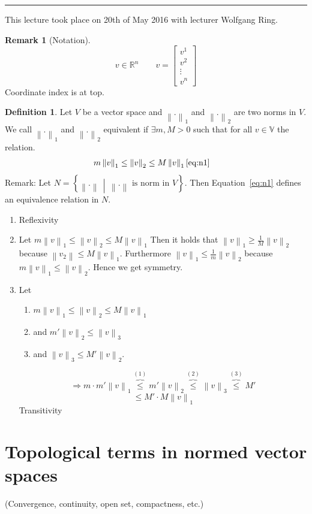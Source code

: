 \documentclass[a4paper,landscape,twocolumn]{article}
\theoremstyle{definition}
\newtheorem{defi}{Definition}
\newtheorem{rem}{Remark}
\newcommand\setdef[2]{\left\{#1\,\middle|\,#2\right\}}
\newcommand\meta[3]{\hrule{} This #1 took place on #2 with lecturer #3.\par}
\newcommand\norm[1]{\left\|#1\right\|}
\begin{document}
\meta{lecture}{20th of May 2016}{Wolfgang Ring}

\begin{rem}[Notation]
  \[ v \in \mathbb R^n \qquad v = \begin{bmatrix} v^1 \\ v^2 \\ \vdots \\ v^n \end{bmatrix} \]
  Coordinate index is at top.
\end{rem}

\begin{defi}
  Let $V$ be a vector space and $\norm{.}_1$ and $\norm{.}_2$ are two norms in $V$.
  We call $\norm{.}_1$ and $\norm{.}_2$ equivalent if $\exists m,M > 0$ such that
  for all $v \in \mathbb V$ the relation.
  \begin{align} m \norm{v}_1 &\leq \norm{v}_2 \leq M \norm{v}_1 \ref{eq:n1} \end{align}
  Remark: Let $N = \setdef{\norm{.}}{\norm{.} \text{ is norm in } V}$.
  Then Equation~\ref{eq:n1} defines an equivalence relation in $N$.
  \begin{enumerate}
    \item Reflexivity
    \item Let $m \norm{v}_1 \leq \norm{v}_2 \leq M \norm{v}_1$
      Then it holds that $\norm{v}_1 \geq \frac{1}{M} \norm{v}_2$
      because $\norm{v_2} \leq M \norm{v}_1$. Furthermore
      $\norm{v}_1 \leq \frac1{m} \norm{v}_2$ because $m \norm{v}_1 \leq \norm{v}_2$.
      Hence we get symmetry.
    \item Let
      \begin{enumerate}
      \item $m \norm{v}_1 \leq \norm{v}_2 \leq M \norm{v}_1$
      \item and $m' \norm{v}_2 \leq \norm{v}_3$
      \item and $\norm{v}_3 \leq M' \norm{v}_2$.
      \end{enumerate}
      \[ \Rightarrow m \cdot m' \norm{v}_1 \overbrace{\leq}^{(1)} m' \norm{v}_2 \overbrace{\leq}^{(2)} \norm{v}_3 \overbrace{\leq}^{(3)} M' \]
      \[ \leq M' \cdot M \norm{v}_1 \]
      Transitivity
  \end{enumerate}
\end{defi}

\section{Topological terms in normed vector spaces}
(Convergence, continuity, open set, compactness, etc.)
\end{document}
